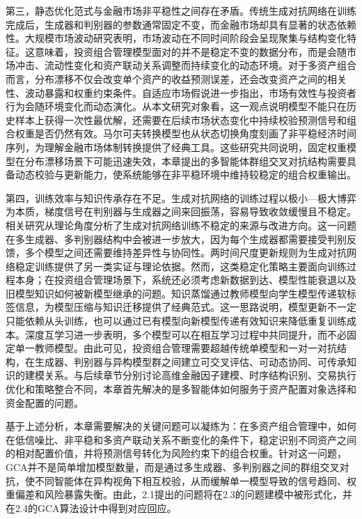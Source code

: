 第三，静态优化范式与金融市场非平稳性之间存在矛盾。传统生成对抗网络在训练完成后，生成器和判别器的参数通常固定不变，而金融市场却具有显著的状态依赖性。大规模市场波动研究表明，市场波动在不同时间阶段会呈现聚集与结构变化特征\cite{plerou2002quantifying}。这意味着，投资组合管理模型面对的并不是稳定不变的数据分布，而是会随市场冲击、流动性变化和资产联动关系调整而持续变化的动态环境。对于多资产组合而言，分布漂移不仅会改变单个资产的收益预测误差，还会改变资产之间的相关性、波动暴露和权重约束条件。自适应市场假说进一步指出，市场有效性与投资者行为会随环境变化而动态演化\cite{lo2004adaptive}。从本文研究对象看，这一观点说明模型不能只在历史样本上获得一次性最优解，还需要在后续市场状态变化中持续校验预测信号和组合权重是否仍然有效。马尔可夫转换模型也从状态切换角度刻画了非平稳经济时间序列，为理解金融市场体制转换提供了经典工具\cite{hamilton1989regime}。这些研究共同说明，固定权重模型在分布漂移场景下可能迅速失效，本章提出的多智能体群组交叉对抗结构需要具备动态校验与更新能力，使系统能够在非平稳环境中维持较稳定的组合权重输出。

第四，训练效率与知识传承存在不足。生成对抗网络的训练过程以极小—极大博弈为本质，梯度信号在判别器与生成器之间来回振荡，容易导致收敛缓慢且不稳定。相关研究从理论角度分析了生成对抗网络训练不稳定的来源与改进方向\cite{arjovsky2017towards}。这一问题在多生成器、多判别器结构中会被进一步放大，因为每个生成器都需要接受判别反馈，多个模型之间还需要维持差异性与协同性。两时间尺度更新规则为生成对抗网络稳定训练提供了另一类实证与理论依据\cite{heusel2017gans}。然而，这类稳定化策略主要面向训练过程本身；在投资组合管理场景下，系统还必须考虑新数据到达、模型性能衰退以及旧模型知识如何被新模型继承的问题。知识蒸馏通过教师模型向学生模型传递软标签信息，为模型压缩与知识迁移提供了经典范式\cite{hinton2015distilling}。这一思路说明，模型更新不一定只能依赖从头训练，也可以通过已有模型向新模型传递有效知识来降低重复训练成本。深度互学习进一步表明，多个模型可以在相互学习过程中共同提升，而不必固定单一教师模型\cite{zhang2018dml}。由此可见，投资组合管理需要超越传统单模型和一对一对抗结构，在生成器、判别器与异构模型群之间建立可交叉评估、可动态协同、可传承知识的建模关系。与后续章节分别讨论高维金融因子建模、时序结构识别、交易执行优化和策略整合不同，本章首先解决的是多智能体如何服务于资产配置对象选择和资金配置的问题。

基于上述分析，本章需要解决的关键问题可以凝练为：在多资产组合管理中，如何在低信噪比、非平稳和多资产联动关系不断变化的条件下，稳定识别不同资产之间的相对配置价值，并将预测信号转化为风险约束下的组合权重。针对这一问题，GCA并不是简单增加模型数量，而是通过多生成器、多判别器之间的群组交叉对抗，使不同智能体在异构视角下相互校验，从而缓解单一模型导致的信号趋同、权重偏差和风险暴露失衡。由此，2.1提出的问题将在2.3的问题建模中被形式化，并在2.4的GCA算法设计中得到对应回应。

